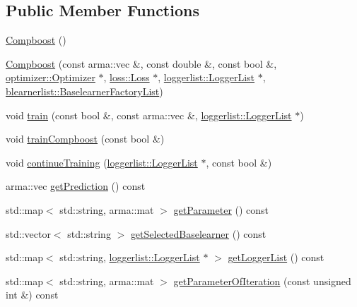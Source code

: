 \subsection*{Public Member Functions}
\begin{DoxyCompactItemize}
\item 
\mbox{\hyperlink{classcboost_1_1_compboost_a5117b7b8cf0a424e736f6833bc5c3a68}{Compboost}} ()
\item 
\mbox{\hyperlink{classcboost_1_1_compboost_a24b98d64e9aac2a7a8ec4e64a49a1f7c}{Compboost}} (const arma\+::vec \&, const double \&, const bool \&, \mbox{\hyperlink{classoptimizer_1_1_optimizer}{optimizer\+::\+Optimizer}} $\ast$, \mbox{\hyperlink{classloss_1_1_loss}{loss\+::\+Loss}} $\ast$, \mbox{\hyperlink{classloggerlist_1_1_logger_list}{loggerlist\+::\+Logger\+List}} $\ast$, \mbox{\hyperlink{classblearnerlist_1_1_baselearner_factory_list}{blearnerlist\+::\+Baselearner\+Factory\+List}})
\item 
void \mbox{\hyperlink{classcboost_1_1_compboost_aa898572eb2c83e0b95c12788a859333b}{train}} (const bool \&, const arma\+::vec \&, \mbox{\hyperlink{classloggerlist_1_1_logger_list}{loggerlist\+::\+Logger\+List}} $\ast$)
\item 
void \mbox{\hyperlink{classcboost_1_1_compboost_a52ea04dec53c68865fdc4a79461d17cb}{train\+Compboost}} (const bool \&)
\item 
void \mbox{\hyperlink{classcboost_1_1_compboost_a191aa22dbfcc3d2e878ef75c0b196d07}{continue\+Training}} (\mbox{\hyperlink{classloggerlist_1_1_logger_list}{loggerlist\+::\+Logger\+List}} $\ast$, const bool \&)
\item 
arma\+::vec \mbox{\hyperlink{classcboost_1_1_compboost_a405c6b88de5b053fefdb24742791da4e}{get\+Prediction}} () const
\item 
std\+::map$<$ std\+::string, arma\+::mat $>$ \mbox{\hyperlink{classcboost_1_1_compboost_a7b90eaa8107f91806b09ceedf8581537}{get\+Parameter}} () const
\item 
std\+::vector$<$ std\+::string $>$ \mbox{\hyperlink{classcboost_1_1_compboost_ac66d4490e6539832d4d304a86db746dc}{get\+Selected\+Baselearner}} () const
\item 
std\+::map$<$ std\+::string, \mbox{\hyperlink{classloggerlist_1_1_logger_list}{loggerlist\+::\+Logger\+List}} $\ast$ $>$ \mbox{\hyperlink{classcboost_1_1_compboost_a0376256bdfde1a50b420ad7412f4b4dd}{get\+Logger\+List}} () const
\item 
std\+::map$<$ std\+::string, arma\+::mat $>$ \mbox{\hyperlink{classcboost_1_1_compboost_a97b02aa81981e08658d896ff9798b5d0}{get\+Parameter\+Of\+Iteration}} (const unsigned int \&) const

\end{DoxyCompactItemize}
